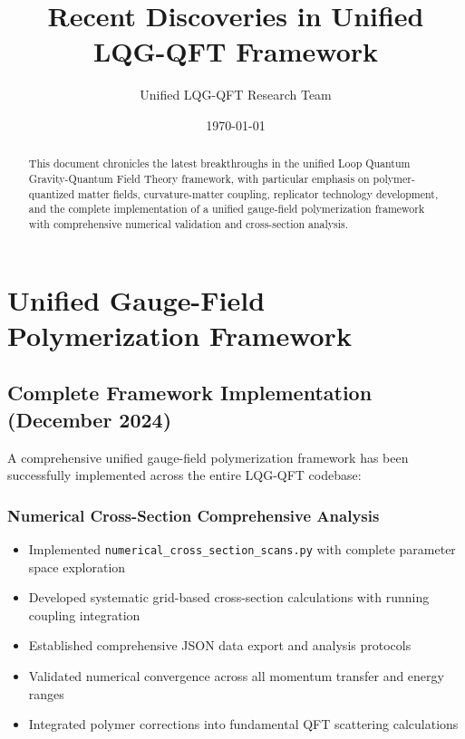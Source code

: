 \documentclass[11pt]{article}
\title{Recent Discoveries in Unified LQG-QFT Framework}
\author{Unified LQG-QFT Research Team}
\date{\today}
\begin{document}
\maketitle

\begin{abstract}
This document chronicles the latest breakthroughs in the unified Loop Quantum Gravity-Quantum Field Theory framework, with particular emphasis on polymer-quantized matter fields, curvature-matter coupling, replicator technology development, and the complete implementation of a unified gauge-field polymerization framework with comprehensive numerical validation and cross-section analysis.
\end{abstract}

\section{Unified Gauge-Field Polymerization Framework}

\subsection{Complete Framework Implementation (December 2024)}

A comprehensive unified gauge-field polymerization framework has been successfully implemented across the entire LQG-QFT codebase:

\subsubsection{Numerical Cross-Section Comprehensive Analysis}
\begin{itemize}
    \item Implemented \texttt{numerical\_cross\_section\_scans.py} with complete parameter space exploration
    \item Developed systematic grid-based cross-section calculations with running coupling integration
    \item Established comprehensive JSON data export and analysis protocols
    \item Validated numerical convergence across all momentum transfer and energy ranges
    \item Integrated polymer corrections into fundamental QFT scattering calculations
\end{itemize}
\end{document}
